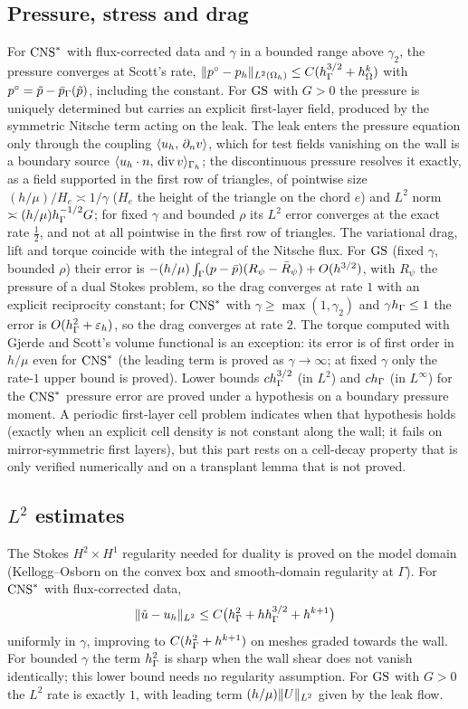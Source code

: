 \subsection{Pressure, stress and drag}
For $\mathrm{CNS}^\ast$ with flux-corrected data and $\gamma$ in a bounded range above $\gamma_2$, the pressure converges at Scott's rate, $\lVert p^\circ-p_h\rVert_{L^2(\Omega_h)}\le C(h_\Gamma^{3/2}+h_\Omega^k)$ with $p^\circ=\tilde p-\bar p_{\Gamma}(\tilde p)$, including the constant. For $\mathrm{GS}$ with $G>0$ the pressure is uniquely determined but carries an explicit first-layer field, produced by the symmetric Nitsche term acting on the leak. The leak enters the pressure equation only through the coupling $\langle u_h,\, \partial_n v\rangle$, which for test fields vanishing on the wall is a boundary source $\langle u_h\cdot n,\, \operatorname{div} v\rangle_{\Gamma_h}$; the discontinuous pressure resolves it exactly, as a field supported in the first row of triangles, of pointwise size $(h/\mu)/H_e\asymp1/\gamma$ ($H_e$ the height of the triangle on the chord $e$) and $L^2$ norm $\asymp(h/\mu)h_\Gamma^{-1/2}G$; for fixed $\gamma$ and bounded $\rho$ its $L^2$ error converges at the exact rate $\frac12$, and not at all pointwise in the first row of triangles. The variational drag, lift and torque coincide with the integral of the Nitsche flux. For $\mathrm{GS}$ (fixed $\gamma$, bounded $\rho$) their error is $-(h/\mu)\int_\Gamma(p-\bar p)(R_\psi-\bar R_\psi)+O(h^{3/2})$, with $R_\psi$ the pressure of a dual Stokes problem, so the drag converges at rate $1$ with an explicit reciprocity constant; for $\mathrm{CNS}^\ast$ with $\gamma\ge\max(1,\gamma_2)$ and $\gamma h_\Gamma\le1$ the error is $O(h_\Gamma^2+\varepsilon_h)$, so the drag converges at rate $2$. The torque computed with Gjerde and Scott's volume functional is an exception: its error is of first order in $h/\mu$ even for $\mathrm{CNS}^\ast$ (the leading term is proved as $\gamma\to\infty$; at fixed $\gamma$ only the rate-$1$ upper bound is proved).
Lower bounds $ch_\Gamma^{3/2}$ (in $L^2$) and $ch_\Gamma$ (in $L^\infty$) for the $\mathrm{CNS}^\ast$ pressure error are proved under a hypothesis on a boundary pressure moment. A periodic first-layer cell problem indicates when that hypothesis holds (exactly when an explicit cell density is not constant along the wall; it fails on mirror-symmetric first layers), but this part rests on a cell-decay property that is only verified numerically and on a transplant lemma that is not proved.

\subsection{\texorpdfstring{$L^2$}{L2} estimates}
The Stokes $H^2\times H^1$ regularity needed for duality is proved on the model domain (Kellogg--Osborn \cite{KelloggOsborn1976} on the convex box and smooth-domain regularity at $\Gamma$). For $\mathrm{CNS}^\ast$ with flux-corrected data,
\[
\lVert \tilde u-u_h\rVert_{L^2}\le C\bigl(h_\Gamma^2+hh_\Gamma^{3/2}+h^{k+1}\bigr)
\]
uniformly in $\gamma$, improving to $C(h_\Gamma^2+h^{k+1})$ on meshes graded towards the wall. For bounded $\gamma$ the term $h_\Gamma^2$ is sharp when the wall shear does not vanish identically; this lower bound needs no regularity assumption. For $\mathrm{GS}$ with $G>0$ the $L^2$ rate is exactly $1$, with leading term $(h/\mu)\lVert U\rVert_{L^2}$ given by the leak flow.

